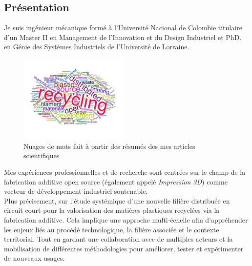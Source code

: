 \documentclass[
  11pt,
]{article}
\begin{document}
\hypertarget{pruxe9sentation}{%
\subsection{Présentation}\label{pruxe9sentation}}

Je suis ingénieur mécanique formé à l'Université Nacional de Colombie
titulaire d'un Master II en Management de l'Innovation et du Design
Industriel et PhD. en Génie des Systèmes Industriels de l'Université de
Lorraine.

\begin{figure}
  \begin{center}
    \includegraphics[width=0.48\textwidth]{Figures/Cloud.png}
  \end{center}
  \caption{Nuages de mots fait à partir des résumés des mes articles scientifiques}
\end{figure}

Mes expériences professionnelles et de recherche sont centrées sur le
champ de la fabrication additive open source (également appelé
\emph{Impression 3D}) comme vecteur de développement industriel
soutenable.\\
Plus précisement, sur l'étude systémique d'une nouvelle filière
distribuée en circuit court pour la valorisation des matières plastiques
recyclées via la fabrication additive. Cela implique une approche
multi-échelle afin d'appréhender les enjeux liés au procédé
technologique, la filière associée et le contexte territorial. Tout en
gardant une collaboration avec de multiples acteurs et la mobilisation
de différentes méthodologies pour améliorer, tester et expérimenter de
nouveaux usages.
\end{document}
